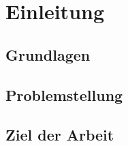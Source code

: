 \chapter{Einleitung}
\label{chap:einleitung}

\section{Grundlagen}
\label{sec:grundlagen}

\section{Problemstellung}
\label{sec:problemstellung}

\section{Ziel der Arbeit}
\label{sec:zielDerArbeit}